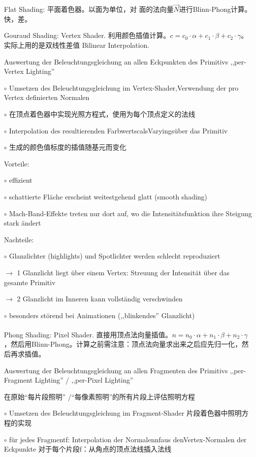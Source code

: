 \documentclass[fleqn]{article}
\begin{document}
\noindent Flat Shading: 平面着色器。以面为单位，对 面的法向量$\overrightarrow{N}$进行Blinn-Phong计算。快，差。

\noindent Gouraud Shading: Vertex Shader. 利用颜色插值计算。$c=c_0\cdot\alpha+c_1\cdot\beta+c_2\cdot\gamma$。实际上用的是双线性差值 Bilinear Interpolation.

Auswertung der Beleuchtungsgleichung an allen Eckpunkten des Primitivs ,,per-Vertex Lighting''

$\circ$ Umsetzen des Beleuchtungsgleichung im Vertex-Shader,Verwendung der pro Vertex definierten Normalen

$\circ$ 在顶点着色器中实现光照方程式，使用为每个顶点定义的法线

$\circ$ Interpolation des resultierenden FarbwertscalsVaryingsüber das Primitiv

$\circ$ 生成的颜色值标度的插值随基元而变化

Vorteile:

$\circ$ effizient 

$\circ$ schattierte Fläche erscheint weitestgehend glatt (smooth shading) 

$\circ$ Mach-Band-Effekte treten nur dort auf, wo die Intensitätsfunktion ihre Steigung stark ändert

Nachteile:

$\circ$ Glanzlichter (highlights) und Spotlichter werden schlecht reproduziert 

$\rightarrow$ 1 Glanzlicht liegt über einem Vertex: Streuung der Intensität über das gesamte Primitiv 

$\rightarrow$ 2 Glanzlicht im Inneren kann vollständig verschwinden

$\circ$ besonders störend bei Animationen (,,blinkendes'' Glanzlicht)
\\
\\
\noindent Phong Shading: Pixel Shader. 直接用顶点法向量插值。$n=n_0\cdot\alpha+n_1\cdot\beta+n_2\cdot\gamma$，然后用Blinn-Phong。计算之前需注意：顶点法向量求出来之后应先归一化，然后再求插值。

Auswertung der Beleuchtungsgleichung an allen Fragmenten des Primitivs ,,per-Fragment Lighting'' / ,,per-Pixel Lighting''

在原始“每片段照明” /“每像素照明”的所有片段上评估照明方程

$\circ$ Umsetzen des Beleuchtungsgleichung im Fragment-Shader 片段着色器中照明方程的实现

$\circ$ für jedes Fragmentf: Interpolation der Normalennfaus denVertex-Normalen der Eckpunkte 对于每个片段f：从角点的顶点法线插入法线
\end{document}

